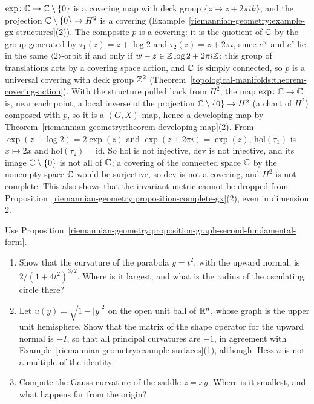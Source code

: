 \begin{solution}
$\exp \colon \mathbb{C} \to \mathbb{C} \setminus \{0\}$ is a covering map with deck group $\{z \mapsto z + 2\pi ik\}$, and the projection $\mathbb{C} \setminus \{0\} \to H^2$ is a covering (Example~\ref{riemannian-geometry:example-gx-structures}(2)). The
composite $p$ is a covering: it is the quotient of $\mathbb{C}$ by the group generated by $\tau_1(z) = z + \log 2$ and $\tau_2(z) = z + 2\pi i$, since $e^w$ and $e^z$ lie in the same $\langle 2\rangle$-orbit if and only if
$w - z \in \mathbb{Z}\log 2 + 2\pi i\mathbb{Z}$; this group of translations acts by a covering space action, and $\mathbb{C}$ is simply connected, so $p$ is a universal covering with deck group $\mathbb{Z}^2$
(Theorem~\ref{topological-manifolds:theorem-covering-action}). With the structure pulled back from $H^2$, the map $\exp \colon \mathbb{C} \to \mathbb{C}$ is, near each point, a local inverse of the projection $\mathbb{C} \setminus \{0\} \to H^2$ (a chart of $H^2$)
composed with $p$, so it is a $(G, X)$-map, hence a developing map by Theorem~\ref{riemannian-geometry:theorem-developing-map}(2). From $\exp(z + \log 2) = 2\exp(z)$ and $\exp(z + 2\pi i) = \exp(z)$, $\mathrm{hol}(\tau_1)$ is
$x \mapsto 2x$ and $\mathrm{hol}(\tau_2) = \mathrm{id}$. So $\mathrm{hol}$ is not injective, $\mathrm{dev}$ is not injective, and its image $\mathbb{C} \setminus \{0\}$ is not all of $\mathbb{C}$; a covering of the connected space $\mathbb{C}$ by the
nonempty space $\mathbb{C}$ would be surjective, so $\mathrm{dev}$ is not a covering, and $H^2$ is not complete. This also shows that the invariant metric cannot be dropped from Proposition~\ref{riemannian-geometry:proposition-complete-gx}(2), even
in dimension $2$.
\end{solution}

\begin{exercise}\label{riemannian-geometry:exercise-graph-curvatures}
Use Proposition~\ref{riemannian-geometry:proposition-graph-second-fundamental-form}.
\begin{enumerate}
\item Show that the curvature of the parabola $y = t^2$, with the upward normal, is $2/(1 + 4t^2)^{3/2}$. Where is it largest, and what is the radius of the osculating circle there?
\item Let $u(y) = \sqrt{1 - |y|^2}$ on the open unit ball of $\mathbb{R}^n$, whose graph is the upper unit hemisphere. Show that the matrix of the shape operator for the upward normal is $-I$, so that all
principal curvatures are $-1$, in agreement with Example~\ref{riemannian-geometry:example-surfaces}(1), although $\operatorname{Hess}u$ is not a multiple of the identity.
\item Compute the Gauss curvature of the saddle $z = xy$. Where is it smallest, and what happens far from the origin?
\end{enumerate}
\end{exercise}

